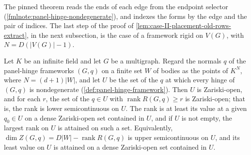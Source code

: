 \begin{fmlnote}
  The pinned theorem reads the ends of each edge from the endpoint
  selector (\cref{fmlnote:panel-hinge-nondegenerate}), and indexes the
  forms by the edge and the pair of indices. The last step of the proof
  of \cref{lem:case-II-placement-old-rows-extract}, in the next
  subsection, is the case of a framework rigid on $V(G)$, with
  $N = D(|V(G)| - 1)$.
\end{fmlnote}

\begin{lemma}
  \label{lem:genericity-device}
  \leanok
  Let $K$ be an infinite field and let $G$ be a multigraph. Regard the
  normals $q$ of the panel-hinge frameworks $(G,q)$ on a finite set $W$ of
  bodies as the points of $K^N$, where $N = (d+1)|W|$, and let $U$ be the
  set of the $q$ at which every hinge of $(G,q)$ is nondegenerate
  (\cref{def:panel-hinge-framework}). Then $U$ is Zariski-open, and for
  each $r$, the set of the $q \in U$ with
  $\operatorname{rank} R(G,q) \ge r$ is Zariski-open; that is, the rank
  is lower semicontinuous on $U$. The rank is at least its value at a
  given $q_0 \in U$ on a dense Zariski-open set contained in $U$, and if
  $U$ is not empty, the largest rank on $U$ is attained on such a set.
  Equivalently, $\dim Z(G,q) = D|W| - \operatorname{rank} R(G,q)$ is
  upper semicontinuous on $U$, and its least value on $U$ is attained on
  a dense Zariski-open set contained in $U$.
\end{lemma}
